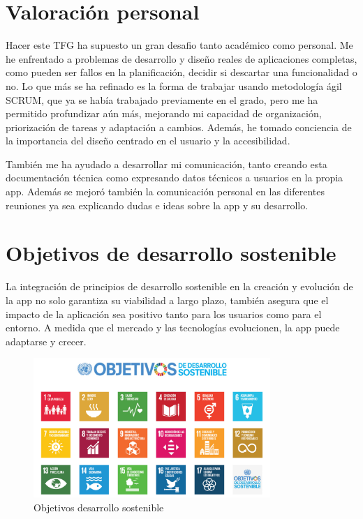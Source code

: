 \section{Valoración personal}

Hacer este TFG ha supuesto un gran desafio tanto académico como personal. Me he enfrentado a problemas de desarrollo y diseño reales de aplicaciones completas, como pueden ser fallos en la planificación, decidir si descartar una funcionalidad o no. Lo que más se ha refinado es la forma de trabajar usando metodología ágil SCRUM, que ya se había trabajado previamente en el grado, pero me ha permitido profundizar aún más, mejorando mi capacidad de organización, priorización de tareas y adaptación a cambios. Además, he tomado conciencia de la importancia del diseño centrado en el usuario y la accesibilidad.

También me ha ayudado a desarrollar mi comunicación, tanto creando esta documentación técnica como expresando datos técnicos a usuarios en la propia app. Además se mejoró también la comunicación personal en las diferentes reuniones ya sea explicando dudas e ideas sobre la app y su desarrollo.

\section{Objetivos de desarrollo sostenible}

La integración de principios de desarrollo sostenible en la creación y evolución de la app no solo garantiza su viabilidad a largo plazo, también asegura que el impacto de la aplicación sea positivo tanto para los usuarios como para el entorno. A medida que el mercado y las tecnologías evolucionen, la app puede adaptarse y crecer.

\begin{figure}[H]
    \centering
    \includegraphics[width=0.8\textwidth]{fotos/2030.png}
    \caption{Objetivos desarrollo sostenible}
    \label{fig:2030}
\end{figure}

